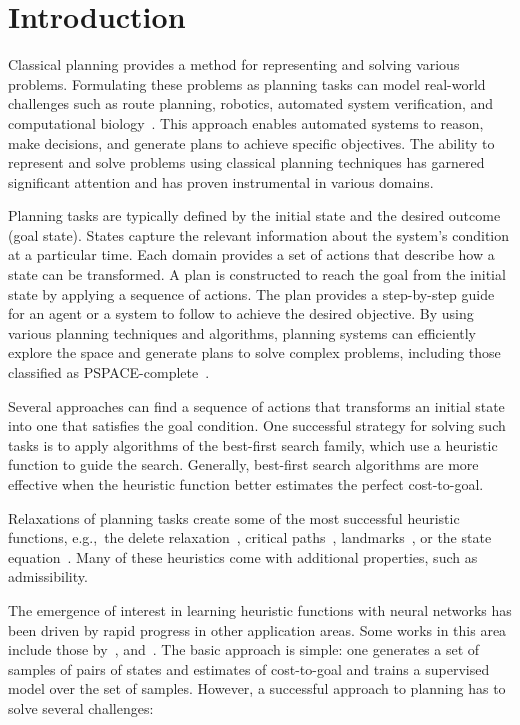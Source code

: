\chapter{Introduction}
\label{chapter:introduction}

Classical planning provides a method for representing and solving various problems. Formulating these problems as planning tasks can model real-world challenges such as route planning, robotics, automated system verification, and computational biology~\cite{edelkamp2012heuristic}. This approach enables automated systems to reason, make decisions, and generate plans to achieve specific objectives. The ability to represent and solve problems using classical planning techniques has garnered significant attention and has proven instrumental in various domains.

Planning tasks are typically defined by the initial state and the desired outcome (goal state). States capture the relevant information about the system's condition at a particular time. Each domain provides a set of actions that describe how a state can be transformed. A plan is constructed to reach the goal from the initial state by applying a sequence of actions. The plan provides a step-by-step guide for an agent or a system to follow to achieve the desired objective. By using various planning techniques and algorithms, planning systems can efficiently explore the space and generate plans to solve complex problems, including those classified as PSPACE-complete~\cite{bylander1994computational}.

Several approaches can find a sequence of actions that transforms an initial state into one that satisfies the goal condition. One successful strategy for solving such tasks is to apply algorithms of the best-first search family, which use a heuristic function to guide the search. Generally, best-first search algorithms are more effective when the heuristic function better estimates the perfect cost-to-goal.

Relaxations of planning tasks create some of the most successful heuristic functions, e.g.,~the delete relaxation~\cite{hoffmann2001ff}, critical paths~\cite{haslum2004admissible}, landmarks~\cite{karpas2009cost,hoffmann2004ordered}, or the state equation~\cite{bonet2013admissible}. Many of these heuristics come with additional properties, such as admissibility.

The emergence of interest in learning heuristic functions with neural networks has been driven by rapid progress in other application areas. Some works in this area include those by~\citet{samadi2008learning,arfaee2011learning,agostinelli2019solving,yu2020learning,shen2020learning,ferber2020neural,toyer2020asnets,ferber2022neural}, and~\citet{otoole2022sampling}. The basic approach is simple: one generates a set of samples of pairs of states and estimates of cost-to-goal and trains a supervised model over the set of samples. However, a successful approach to planning has to solve several challenges:

